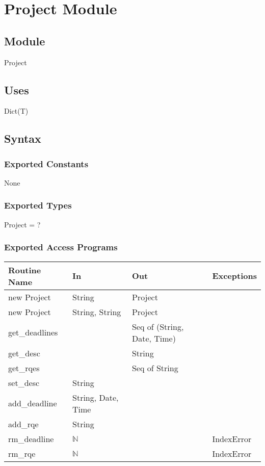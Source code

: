 \documentclass[12pt, titlepage]{article}
\begin{document}
\newpage

\section* {Project Module}

\subsection*{Module}
Project

\subsection* {Uses}
Dict(T)

\subsection* {Syntax}
\subsubsection* {Exported Constants}
None

\subsubsection* {Exported Types}
Project = ?

\subsubsection* {Exported Access Programs}
\begin{tabular}{|l|l|l|l|}
    \hline
    \textbf{Routine Name} & \textbf{In} & \textbf{Out} & \textbf{Exceptions} \\
    \hline
    new Project & String & Project & \\
    \hline
    new Project & String, String & Project & \\
    \hline
    get\_deadlines & & Seq of (String, Date, Time)& \\
    \hline
    get\_desc & & String &\\
    \hline
    get\_rqes & & Seq of String & \\
    \hline
    set\_desc & String & &\\
    \hline
    add\_deadline & String, Date, Time & & \\
    \hline
    add\_rqe & String & & \\
    \hline
    rm\_deadline & $\mathbb{N}$ &  & IndexError\\
    \hline
    rm\_rqe & $\mathbb{N}$ &  & IndexError\\
    \hline
\end{tabular}
\end{document}
